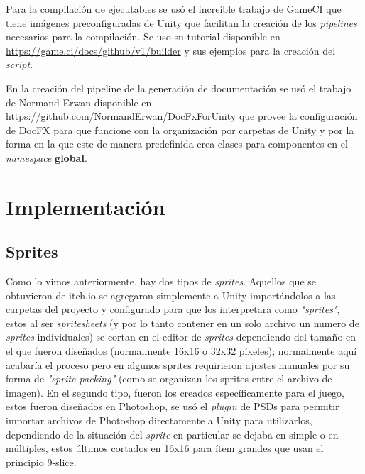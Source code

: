 Para la compilación de ejecutables se usó el increíble trabajo de GameCI que tiene imágenes preconfiguradas de Unity que facilitan la creación de los \textit{pipelines} necesarios para la compilación. Se uso su tutorial disponible en \url{https://game.ci/docs/github/v1/builder} y sus ejemplos para la creación del \textit{script}.

En la creación del pipeline de la generación de documentación se usó el trabajo de Normand Erwan disponible en \url{https://github.com/NormandErwan/DocFxForUnity} que provee la configuración de DocFX para que funcione con la organización por carpetas de Unity y por la forma en la que este de manera predefinida crea clases para componentes en el \textit{namespace} \textbf{global}.

\section{Implementación}
\subsection{Sprites}
Como lo vimos anteriormente, hay dos tipos de \textit{sprites}. Aquellos que se obtuvieron de itch.io se agregaron simplemente a Unity importándolos a las carpetas del proyecto y configurado para que los interpretara como \textit{"sprites"}, estos al ser \textit{spritesheets} (y por lo tanto contener en un solo archivo un numero de \textit{sprites} individuales) se cortan en el editor de \textit{sprites} dependiendo del tamaño en el que fueron diseñados (normalmente 16x16 o 32x32 píxeles); normalmente aquí acabaría el proceso pero en algunos sprites requirieron ajustes manuales por su forma de \textit{"sprite packing"} (como se organizan los sprites entre el archivo de imagen). En el segundo tipo, fueron los creados específicamente para el juego, estos fueron diseñados en Photoshop, se usó el \textit{plugin} de PSDs para permitir importar archivos de Photoshop directamente a Unity para utilizarlos, dependiendo de la situación del \textit{sprite} en particular se dejaba en simple o en múltiples, estos últimos cortados en  16x16 para ítem grandes que usan el principio 9-slice.

